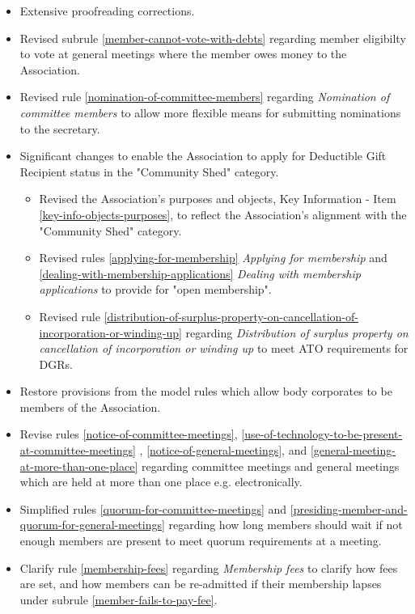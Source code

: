 \documentclass[../constitution.tex]{subfiles}
\begin{document}
\begin{itemize}
    \item Extensive proofreading corrections.
    \item Revised subrule \ref{member-cannot-vote-with-debts} regarding member eligibilty to vote at general meetings where the member owes money to the Association.
    \item Revised rule \ref{nomination-of-committee-members} regarding \textit{Nomination of committee members} to allow more flexible means for submitting nominations to the secretary.
    \item Significant changes to enable the Association to apply for Deductible Gift Recipient status in the "Community Shed" category.
          \begin{itemize}
              \item Revised the Association's purposes and objects, Key Information - Item \ref{key-info-objects-purposes}, to reflect the Association's alignment with the "Community Shed" category.
              \item Revised rules \ref{applying-for-membership} \textit{Applying for membership} and \ref{dealing-with-membership-applications} \textit{Dealing with membership applications} to provide for "open membership".
              \item Revised rule \ref{distribution-of-surplus-property-on-cancellation-of-incorporation-or-winding-up} regarding \textit{Distribution of surplus property on cancellation of incorporation or winding up} to meet ATO requirements for DGRs.
          \end{itemize}
    \item Restore provisions from the model rules which allow body corporates to be members of the Association.
    \item Revise rules \ref{notice-of-committee-meetings}, \ref{use-of-technology-to-be-present-at-committee-meetings} , \ref{notice-of-general-meetings}, and \ref{general-meeting-at-more-than-one-place} regarding committee meetings and general meetings which are held at more than one place e.g. electronically.
    \item Simplified rules \ref{quorum-for-committee-meetings} and \ref{presiding-member-and-quorum-for-general-meetings} regarding how long members should wait if not enough members are present to meet quorum requirements at a meeting.
    \item Clarify rule \ref{membership-fees} regarding \textit{Membership fees} to clarify how fees are set, and how members can be re-admitted if their membership lapses under subrule \ref{member-fails-to-pay-fee}.

\end{itemize}
\end{document}
